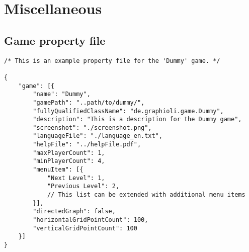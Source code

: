 \section{Miscellaneous}
\subsection{Game property file}

\begin{lstlisting}[caption=An example of a property file]
/* This is an example property file for the 'Dummy' game. */

{
    "game": [{
        "name": "Dummy",
        "gamePath": "..path/to/dummy/",
        "fullyQualifiedClassName": "de.graphioli.game.Dummy",
        "description": "This is a description for the Dummy game",
        "screenshot": "./screenshot.png",
        "languageFile": "./language_en.txt",
        "helpFile": "../helpFile.pdf",
        "maxPlayerCount": 1,
        "minPlayerCount": 4,
        "menuItem": [{
            "Next Level": 1,
            "Previous Level": 2,
            // This list can be extended with additional menu items
        }],
        "directedGraph": false,
        "horizontalGridPointCount": 100,
        "verticalGridPointCount": 100
    }]
}
\end{lstlisting}
